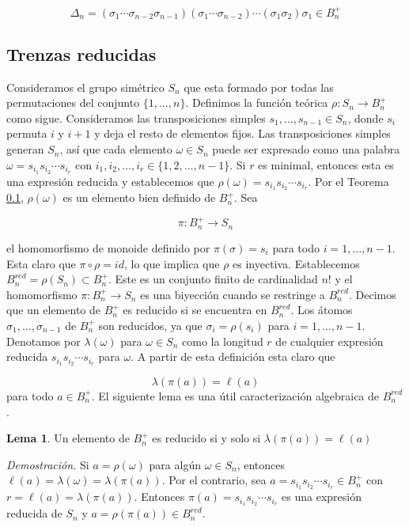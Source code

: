 \documentclass[12pt]{article}
\theoremstyle{definition}
\newtheorem{lema}{Lema}[section]
\begin{document}
$$\Delta_n = (\sigma_1\cdots\sigma_{n-2}\sigma_{n-1})(\sigma_1\cdots\sigma_{n-2})\cdots(\sigma_1\sigma_2)\sigma_1\in B_n^+$$

\subsection{Trenzas reducidas}

Consideramos el grupo simétrico $S_n$ que esta formado por todas las permutaciones del conjunto $\{1,\ldots,n\}$. Definimos la función teórica $\rho:S_n\rightarrow B_n^+$ como sigue. Consideramos las transposiciones simples $s_1,\ldots,s_{n-1}\in S_n$, donde $s_i$ permuta $i$ y $i+1$ y deja el resto de elementos fijos. Las transposiciones simples generan $S_n$, así que cada elemento $\omega\in S_n$ puede ser expresado como una palabra $\omega = s_{i_1}s_{i_2}\cdots s_{i_r}$ con $i_1,i_2,\ldots,i_r\in\{1,2,\ldots,n-1\}$. Si $r$ es minimal, entonces esta es una expresión reducida y establecemos que $\rho(\omega)=s_{i_1}s_{i_2}\cdots s_{i_r}$. Por el Teorema \ref{}, $\rho(\omega)$ es un elemento bien definido de $B_n^+$. Sea

$$\pi:B_n^+\rightarrow S_n$$

el homomorfismo de monoide definido por $\pi(\sigma)=s_i$ para todo $i=1,\ldots,n-1$. Esta claro que $\pi\circ\rho = id$, lo que implica que $\rho$ es inyectiva.
\newline
\newline
Establecemos $B_n^{red}=\rho(S_n)\subset B_n^+$. Este es un conjunto finito de cardinalidad $n!$ y el homomorfismo $\pi:B_n^+\rightarrow S_n$ es una biyección cuando se restringe a $B_n^{red}$. Decimos que un elemento de $B_n^+$ es reducido si se encuentra en $B_n^{red}$. Los átomos $\sigma_1,\ldots,\sigma_{n-1}$ de $B_n^+$ son reducidos, ya que $\sigma_i=\rho(s_i)$ para $i=1,\ldots,n-1$. Denotamos por $\lambda(\omega)$ para $\omega\in S_n$ como la longitud $r$ de cualquier expresión reducida $s_{i_1}s_{i_2}\cdots s_{i_r}$ para $\omega$. A partir de esta definición esta claro que 

$$\lambda(\pi(a))=\ell(a)$$
\newline
para todo $a\in B_n^+$. El siguiente lema es una útil caracterización algebraica de $B_n^{red}$.

\begin{lema}
Un elemento de $B_n^+$ es reducido si y solo si $\lambda(\pi(a))=\ell(a)$
\label{lema:reduced1}
\end{lema}

\textit{Demostración.} Si $a=\rho(\omega)$ para algún $\omega\in S_n$, entonces $\ell(a)=\lambda(\omega)=\lambda(\pi(a))$. Por el contrario, sea $a=s_{i_1}s_{i_2}\cdots s_{i_r}\in B_n^+$ con $r=\ell(a)=\lambda(\pi(a))$. Entonces $\pi(a)=s_{i_1}s_{i_2}\cdots s_{i_r}$ es una expresión reducida de $S_n$ y $a=\rho(\pi(a))\in B_n^{red}$.
\end{document}
